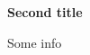 \makeatletter

\begin{titlepage}
    \enlargethispage{2cm}
 	
 	\AddToShipoutPicture{
    }

    \begin{center}
        \vspace*{6cm}
 		
        \textsc{\@title} %
        
		\vspace*{1cm}
        
        \HRule
        
        \Large{\textbf{Second title}}

		\HRule

		\vspace*{2cm}
		
		\large{Some info}
		
		\vspace*{0.5cm}
 		
        \large{\@author}
        
        \vspace*{0.5cm}
        
        \@date %
        
        
        
        
        
        
    \end{center}

\end{titlepage}
\ClearShipoutPicture

\makeatother
